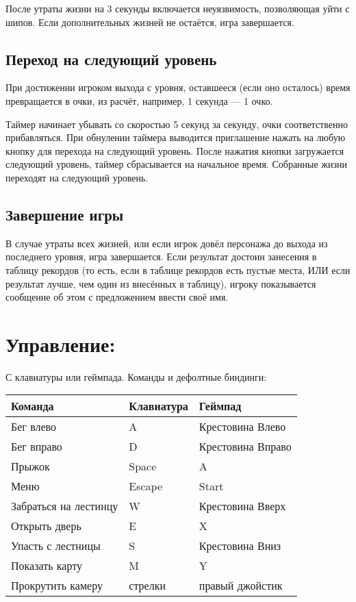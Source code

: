 \documentclass[12pt,a4paper]{article}
\begin{document}
После утраты жизни на 3 секунды включается неуязвимость, позволяющая уйти с шипов. Если дополнительных жизней не остаётся, игра завершается.
\subsection{Переход на следующий уровень}
При достижении игроком выхода с уровня, оставшееся (если оно осталось) время превращается в очки, из расчёт, например, 1 секунда --- 1 очко.

Таймер начинает убывать со скоростью 5 секунд за секунду, очки соответственно прибавляться. При обнулении таймера выводится приглашение нажать на любую кнопку для перехода на следующий уровень. После нажатия кнопки загружается следующий уровень, таймер сбрасывается на начальное время. Собранные жизни переходят на следующий уровень.
\subsection{Завершение игры}
В случае утраты всех жизней, или если игрок довёл персонажа до выхода из последнего уровня, игра завершается. Если результат достоин занесения в таблицу рекордов (то есть, если в таблице рекордов есть пустые места, ИЛИ если результат лучше, чем один из внесённых в таблицу), игроку показывается сообщение об этом с предложением ввести своё имя.
\section{Управление:}
С клавиатуры или геймпада.
Команды и дефолтные биндинги:\\
\begin{tabular}{|p{6cm}|p{2.5cm}|p{3cm}|}
\hline
Команда & Клавиатура & Геймпад\\
\hline
Бег влево & A & Крестовина Влево \\
\hline
Бег вправо & D & Крестовина Вправо \\
\hline
Прыжок & Space & A \\
\hline
Меню & Escape & Start \\
\hline
Забраться на лестинцу & W & Крестовина Вверх \\
\hline
Открыть дверь & E & X \\
\hline
Упасть с лестницы & S & Крестовина Вниз \\
\hline
Показать карту & M & Y \\
\hline
Прокрутить камеру & стрелки & правый джойстик \\
\hline
\end{tabular}
\end{document}
